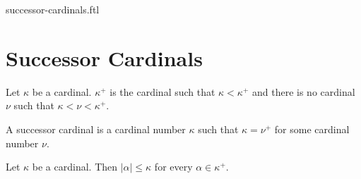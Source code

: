 \documentclass{naproche-library}
\begin{document}
\begin{smodule}{successor-cardinals.ftl}

  \section*{Successor Cardinals}

  \begin{definition}[forthel,id=SET_THEORY_06_9568425123021254]
    Let $\kappa$ be a cardinal.
    $\kappa^+$ is the cardinal such that $\kappa < \kappa^+$ and there is no cardinal $\nu$ such that $\kappa < \nu < \kappa^+$.
  \end{definition}

  \begin{definition}[forthel,id=SET_THEORY_06_6818986081648640]
    A successor cardinal is a cardinal number $\kappa$ such that $\kappa = \nu^+$ for some cardinal number $\nu$.
  \end{definition}

  \begin{proposition}[forthel,id=SET_THEORY_06_5231202126545218]
    Let $\kappa$ be a cardinal.
    Then $|\alpha| \leq \kappa$ for every $\alpha \in \kappa^+$.
  \end{proposition}
\end{smodule}
\end{document}

